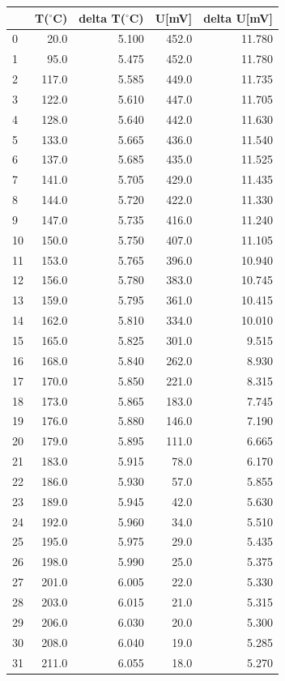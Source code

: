 \documentclass[a4paper,10pt]{article}
\begin{document}
\begin{tabular}{lrrrr}
\hline
{} &T($^\circ$C)&delta T($^\circ$C)&U[mV]&delta U[mV]\\
\hline
0  &   20.0 &  5.100 &  452.0 &  11.780 \\
1  &   95.0 &  5.475 &  452.0 &  11.780 \\
2  &  117.0 &  5.585 &  449.0 &  11.735 \\
3  &  122.0 &  5.610 &  447.0 &  11.705 \\
4  &  128.0 &  5.640 &  442.0 &  11.630 \\
5  &  133.0 &  5.665 &  436.0 &  11.540 \\
6  &  137.0 &  5.685 &  435.0 &  11.525 \\
7  &  141.0 &  5.705 &  429.0 &  11.435 \\
8  &  144.0 &  5.720 &  422.0 &  11.330 \\
9  &  147.0 &  5.735 &  416.0 &  11.240 \\
10 &  150.0 &  5.750 &  407.0 &  11.105 \\
11 &  153.0 &  5.765 &  396.0 &  10.940 \\
12 &  156.0 &  5.780 &  383.0 &  10.745 \\
13 &  159.0 &  5.795 &  361.0 &  10.415 \\
14 &  162.0 &  5.810 &  334.0 &  10.010 \\
15 &  165.0 &  5.825 &  301.0 &   9.515 \\
16 &  168.0 &  5.840 &  262.0 &   8.930 \\
17 &  170.0 &  5.850 &  221.0 &   8.315 \\
18 &  173.0 &  5.865 &  183.0 &   7.745 \\
19 &  176.0 &  5.880 &  146.0 &   7.190 \\
20 &  179.0 &  5.895 &  111.0 &   6.665 \\
21 &  183.0 &  5.915 &   78.0 &   6.170 \\
22 &  186.0 &  5.930 &   57.0 &   5.855 \\
23 &  189.0 &  5.945 &   42.0 &   5.630 \\
24 &  192.0 &  5.960 &   34.0 &   5.510 \\
25 &  195.0 &  5.975 &   29.0 &   5.435 \\
26 &  198.0 &  5.990 &   25.0 &   5.375 \\
27 &  201.0 &  6.005 &   22.0 &   5.330 \\
28 &  203.0 &  6.015 &   21.0 &   5.315 \\
29 &  206.0 &  6.030 &   20.0 &   5.300 \\
30 &  208.0 &  6.040 &   19.0 &   5.285 \\
31 &  211.0 &  6.055 &   18.0 &   5.270 \\
\hline
\end{tabular}
\end{document}
